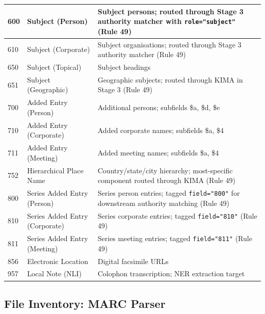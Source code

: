 \documentclass[12pt]{article}
\newcommand{\code}[1]{\texttt{#1}}
\begin{document}
\begin{longtable}{|l|l|p{8cm}|}
\hline
600 & Subject (Person) & Subject persons; routed through Stage 3 authority matcher with \code{role="subject"} (Rule 49) \\
\hline
610 & Subject (Corporate) & Subject organisations; routed through Stage 3 authority matcher (Rule 49) \\
\hline
650 & Subject (Topical) & Subject headings \\
\hline
651 & Subject (Geographic) & Geographic subjects; routed through KIMA in Stage 3 (Rule 49) \\
\hline
700 & Added Entry (Person) & Additional persons; subfields \$a, \$d, \$e \\
\hline
710 & Added Entry (Corporate) & Added corporate names; subfields \$a, \$4 \\
\hline
711 & Added Entry (Meeting) & Added meeting names; subfields \$a, \$4 \\
\hline
752 & Hierarchical Place Name & Country/state/city hierarchy; most-specific component routed through KIMA (Rule 49) \\
\hline
800 & Series Added Entry (Person) & Series person entries; tagged \code{field="800"} for downstream authority matching (Rule 49) \\
\hline
810 & Series Added Entry (Corporate) & Series corporate entries; tagged \code{field="810"} (Rule 49) \\
\hline
811 & Series Added Entry (Meeting) & Series meeting entries; tagged \code{field="811"} (Rule 49) \\
\hline
856 & Electronic Location & Digital facsimile URLs \\
\hline
957 & Local Note (NLI) & Colophon transcription; NER extraction target \\
\hline
\end{longtable}

\subsection{File Inventory: MARC Parser}
\end{document}
